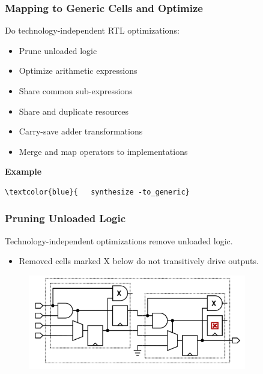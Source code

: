 \documentclass[t, notes, xcolor=table]{beamer}
\begin{document}
\begin{frame}[fragile]
\frametitle{Mapping to Generic Cells and Optimize}
\footnotesize{
Do technology-independent RTL optimizations:
\begin{itemize}
\item Prune unloaded logic
\item Optimize arithmetic expressions
\item Share common sub-expressions
\item Share and duplicate resources
\item Carry-save adder transformations
\item Merge and map operators to implementations
\end{itemize}
\vspace{6pt}
\textbf{Example}
\begin{Verbatim}[commandchars=\\\{\}, tabsize=2]
\textcolor{blue}{	synthesize -to_generic}
\end{Verbatim}

}
\end{frame}

\begin{frame}
\frametitle{Pruning Unloaded Logic}
\footnotesize{
Technology-independent optimizations remove unloaded logic.
\begin{itemize}
\item Removed cells marked X below do not transitively drive outputs.
\end{itemize}
\begin{figure}
    \includegraphics[width=0.85\textwidth]{img/17_prune.png}
\end{figure}
}
\end{frame}
\end{document}
